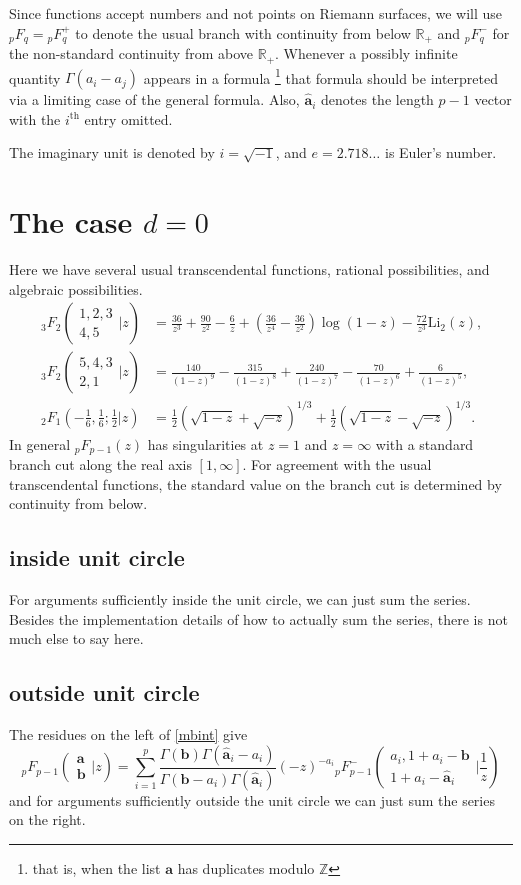 \documentclass[12pt]{article}
\newcommand{\ee}[0] {e}
\newcommand{\ii}[0] {i}
\numberwithin{equation}{section}
\newcommand{\FF}[6] {{}_{#1}{#2}_{#3} \left( \begin{array}{c} #4 \\ #5 \end{array} \Big| #6  \right)}
\newcommand{\FFe}[7] {{}_{#1}^{\,}{#2}_{#3}^{#4} \left( \begin{array}{c} #5 \\ #6 \end{array} \Big| #7 \right)}
\newcommand{\FFf}[5] {{}_{#1}{#2}_{#3} \left(#4 | {#5} \right)}
\newcommand{\bfa}[0] {\mathbf{a}}
\begin{document}
Since functions accept numbers and not points on Riemann surfaces, we will use ${}_p F_{q} = {}_p F_{q}^{+}$ to denote the usual branch with continuity from below $\mathbb{R}_{+}$ and ${}_p^{\,} F_{q}^{-}$ for the non-standard continuity from above $\mathbb{R}_{+}$. Whenever a possibly infinite quantity $\Gamma(a_i-a_j)$ appears in a formula \footnote{that is, when the list $\bfa$ has duplicates modulo $\mathbb{Z}$} that formula should be interpreted via a limiting case of the general formula. Also, $\hat{\mathbf{a}}_i$ denotes the length $p-1$ vector with the $i^{\text{th}}$ entry omitted.

The imaginary unit is denoted by $\ii = \sqrt{-1}$, and $\ee = 2.718\dots$ is Euler's number.

\section{The case $d=0$}
Here we have several usual transcendental functions, rational possibilities, and algebraic possibilities.
\begin{align*}
\FF{3}{F}{2}{1,2,3}{4,5}{z} &= \frac{36}{z^3}+\frac{90}{z^2}-\frac{6}{z}+\left
   (\frac{36}{z^4}-\frac{36}{z^2}\right) \log
   (1-z)-\frac{72}{z^3}
   \text{Li}_2(z)\text{,}\\
\FF{3}{F}{2}{5,4,3}{2,1}{z} &= \frac{140}{(1-z)^9}-\frac{315}{(1-z)^8}+\frac{240}{(1-z)^7}-\frac{70}{(1-z)^6}+\frac{6}{(1-z)^5}\text{,}\\
\FFf{2}{F}{1}{-\tfrac{1}{6}, \tfrac{1}{6};\tfrac{1}{2}}{z} &= \tfrac{1}{2} \left(\sqrt{1-z}+\sqrt{-z}\right)^{1/3}+\tfrac{1}{2} \left(\sqrt{1-z}-\sqrt{-z}\right)^{1/3}\text{.}
\end{align*}
In general ${}_{p}F_{p-1}(z)$ has singularities at $z=1$ and $z=\infty$ with a standard branch cut along the real axis $[1,\infty]$. For agreement with the usual transcendental functions, the standard value on the branch cut is determined by continuity from below.

\subsection{inside unit circle}
For arguments sufficiently inside the unit circle, we can just sum the series. Besides the implementation details of how to actually sum the series, there is not much else to say here.

\subsection{outside unit circle}
The residues on the left of \eqref{mbint} give
\begin{equation}
\label{balanced_outside}
\FF{p}{F}{p-1}{\mathbf{a}}{\mathbf{b}}{z} = \sum_{i=1}^{p} \frac{\Gamma(\mathbf{b}) \Gamma(\hat{\mathbf{a}}_i-a_i)}{\Gamma(\mathbf{b}-a_i) \Gamma(\hat{\mathbf{a}}_i)} (-z)^{-a_i} \FFe{p}{F}{p-1}{-}{a_i,1+a_i-\mathbf{b}}{1+a_i-\hat{\mathbf{a}}_i}{\frac{1}{z}}
\end{equation}
and for arguments sufficiently outside the unit circle we can just sum the series on the right.
\end{document}
